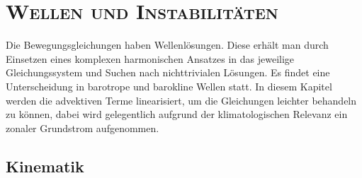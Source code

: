 \documentclass{book}
\begin{document}
\chapter{\normalfont\textsc{Wellen und Instabilitäten}}
\label{chap:wellen_und_instabilitaeten}

Die Bewegungsgleichungen haben Wellenlösungen. Diese erhält man durch Einsetzen eines komplexen harmonischen Ansatzes in das jeweilige Gleichungssystem und Suchen nach nichttrivialen Lösungen. Es findet eine Unterscheidung in barotrope und barokline Wellen statt. In diesem Kapitel werden die advektiven Terme linearisiert, um die Gleichungen leichter behandeln zu können, dabei wird gelegentlich aufgrund der klimatologischen Relevanz ein zonaler Grundstrom aufgenommen.

\section{Kinematik}
\label{sec:kinematik}
\end{document}
